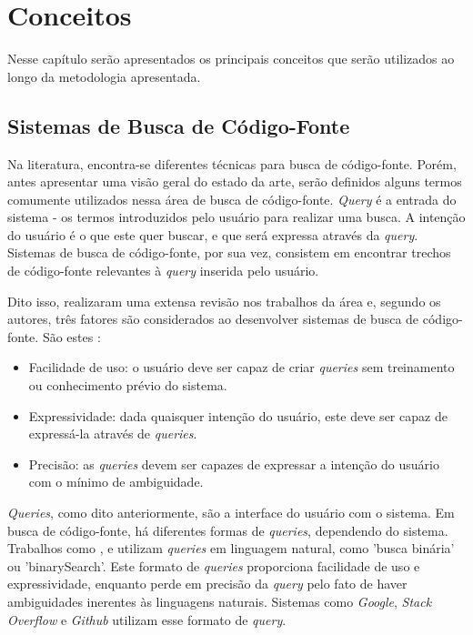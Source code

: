 \chapter{Conceitos}
\label{chp:concepts}
Nesse capítulo serão apresentados os principais conceitos que serão utilizados ao longo da metodologia apresentada.

\section{Sistemas de Busca de Código-Fonte}
Na literatura, encontra-se diferentes técnicas para busca de código-fonte. Porém, antes apresentar uma visão geral do estado da arte, serão definidos alguns termos comumente utilizados nessa área de busca de código-fonte. \textit{Query} é a entrada do sistema - os termos introduzidos pelo usuário para realizar uma busca. A intenção do usuário é o que este quer buscar, e que será expressa através da \textit{query}. Sistemas de busca de código-fonte, por sua vez, consistem em encontrar trechos de código-fonte relevantes à \textit{query} inserida pelo usuário.

Dito isso, \textcite{Grazia2022CodeSA} realizaram uma extensa revisão nos trabalhos da área e, segundo os autores, três fatores são considerados ao desenvolver sistemas de busca de código-fonte. São estes \cite{Grazia2022CodeSA}:
\begin{itemize}
  \item Facilidade de uso: o usuário deve ser capaz de criar \textit{queries} sem treinamento ou conhecimento prévio do sistema.
  \item Expressividade: dada quaisquer intenção do usuário, este deve ser capaz de expressá-la através de \textit{queries}.
  \item Precisão: as \textit{queries} devem ser capazes de expressar a intenção do usuário com o mínimo de ambiguidade.
\end{itemize}

\textit{Queries}, como dito anteriormente, são a interface do usuário com o sistema. Em busca de código-fonte, há diferentes formas de \textit{queries}, dependendo do sistema. 
Trabalhos como \cite{NGUYEN2017CombiningWW}, \cite{Chen2018ANF} e \cite{Du2021IsAS} utilizam \textit{queries} em linguagem natural, como 'busca binária' ou 'binarySearch'. Este formato de \textit{queries} proporciona facilidade de uso e expressividade, enquanto perde em precisão da \textit{query} pelo fato de haver ambiguidades inerentes às linguagens naturais. Sistemas como \textit{Google}, \textit{Stack Overflow} e \textit{Github} utilizam esse formato de \textit{query}.

